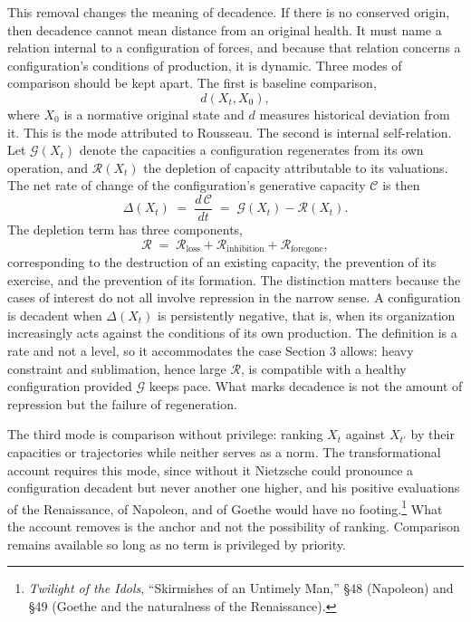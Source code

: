 \documentclass[11pt]{article}
\theoremstyle{definition}
\begin{document}
This removal changes the meaning of decadence. If there is no conserved origin, then decadence cannot mean distance from an original health. It must name a relation internal to a configuration of forces, and because that relation concerns a configuration's conditions of production, it is dynamic. Three modes of comparison should be kept apart. The first is baseline comparison,
\[
d(X_t,X_0),
\]
where $X_0$ is a normative original state and $d$ measures historical deviation from it. This is the mode attributed to Rousseau. The second is internal self-relation. Let $\mathcal{G}(X_t)$ denote the capacities a configuration regenerates from its own operation, and $\mathcal{R}(X_t)$ the depletion of capacity attributable to its valuations. The net rate of change of the configuration's generative capacity $\mathcal{C}$ is then
\begin{equation}\label{eq:delta}
\Delta(X_t) \;=\; \frac{d\,\mathcal{C}}{dt} \;=\; \mathcal{G}(X_t) - \mathcal{R}(X_t).
\end{equation}
The depletion term has three components,
\[
\mathcal{R} \;=\; \mathcal{R}_{\mathrm{loss}} + \mathcal{R}_{\mathrm{inhibition}} + \mathcal{R}_{\mathrm{foregone}},
\]
corresponding to the destruction of an existing capacity, the prevention of its exercise, and the prevention of its formation. The distinction matters because the cases of interest do not all involve repression in the narrow sense.
A configuration is decadent when $\Delta(X_t)$ is persistently negative, that is, when its organization increasingly acts against the conditions of its own production. The definition is a rate and not a level, so it accommodates the case Section 3 allows: heavy constraint and sublimation, hence large $\mathcal{R}$, is compatible with a healthy configuration provided $\mathcal{G}$ keeps pace. What marks decadence is not the amount of repression but the failure of regeneration.

The third mode is comparison without privilege: ranking $X_t$ against $X_{t'}$ by their capacities or trajectories while neither serves as a norm. The transformational account requires this mode, since without it Nietzsche could pronounce a configuration decadent but never another one higher, and his positive evaluations of the Renaissance, of Napoleon, and of Goethe would have no footing.\footnote{\emph{Twilight of the Idols}, ``Skirmishes of an Untimely Man,'' \S48 (Napoleon) and \S49 (Goethe and the naturalness of the Renaissance).} What the account removes is the anchor and not the possibility of ranking. Comparison remains available so long as no term is privileged by priority.
\end{document}
